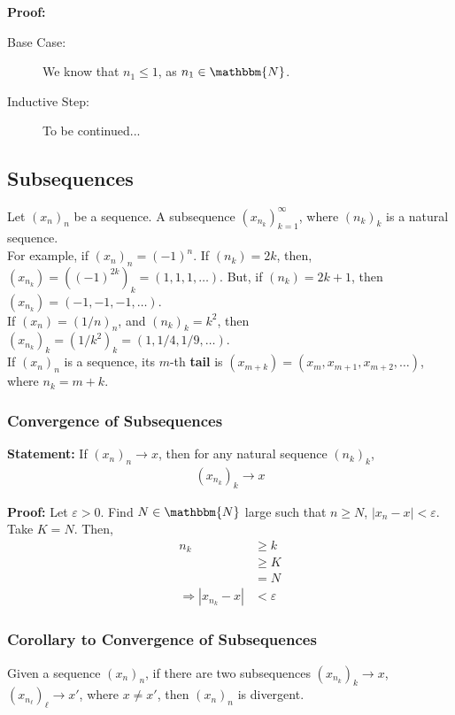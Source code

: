 \documentclass[10pt]{extarticle}
\newcommand{\N}{\mathbbm{N}}
\begin{document}
    \textbf{Proof:}
      \begin{description}
        \item[Base Case:] We know that $n_1 \leq 1$, as $n_1\in\N$.
        \item[Inductive Step:] To be continued...
      \end{description}
  \subsection{Subsequences}%
    Let $(x_n)_n$ be a sequence. A subsequence $(x_{n_k})_{k=1}^{\infty}$, where $(n_k)_{k}$ is a natural sequence.\\

    For example, if $(x_n)_n = (-1)^n$. If $(n_k) = 2k$, then, $(x_{n_k}) = \left((-1)^{2k}\right)_k = (1,1,1,\dots)$. But, if $(n_k) = 2k+1$, then $(x_{n_k}) = (-1,-1,-1,\dots)$.\\

    If $(x_n) = (1/n)_n$, and $(n_k)_k = k^2$, then $(x_{n_k})_{k} = (1/k^2)_{k} = (1,1/4,1/9,\dots)$.\\

    If $(x_n)_n$ is a sequence, its $m$-th \textbf{tail} is $(x_{m+k}) = (x_m,x_{m+1},x_{m+2},\dots)$, where $n_k = m+k$.
    \subsubsection{Convergence of Subsequences}%
    \textbf{Statement:} If $(x_n)_n \rightarrow x$, then for any natural sequence $(n_k)_k$,
      \begin{align*}
        \left(x_{n_k}\right)_k \rightarrow x
      \end{align*}
      
      \textbf{Proof:} Let $\varepsilon > 0$. Find $N\in\N$ large such that $n \geq N$, $|x_{n} - x| < \varepsilon$.\\

      Take $K = N$. Then,
      \begin{align*}
        n_k &\geq k\\
        &\geq K\\
        &= N\\
        \Rightarrow |x_{n_k} - x| &< \varepsilon
      \end{align*}
      \subsubsection{Corollary to Convergence of Subsequences}%
    Given a sequence $(x_n)_n$, if there are two subsequences $(x_{n_k})_k \rightarrow x$, $(x_{n_\ell})_{\ell} \rightarrow x'$, where $x \neq x'$, then $(x_n)_n$ is divergent.\\
\end{document}
